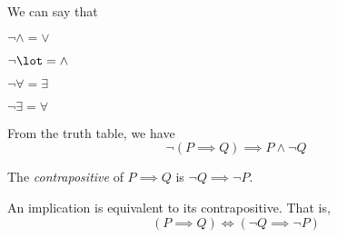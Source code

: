 \begin{named}[Note]
We can say that
\bitem
\item $\lnot \land = \lor$
\item $\lnot \lot = \land$
\item $\lnot \forall = \exists$
\item $\lnot \exists = \forall$
\eitem
\end{named}

From the truth table, we have 
$$\lnot (P \implies Q) \implies P \land \lnot Q$$

\begin{definition}
	The \emph{contrapositive} of $P \implies Q$ is $\lnot Q \implies \lnot P$.
\end{definition}

\begin{theorem}
	An implication is equivalent to its contrapositive. That is,
	$$(P \implies Q) \iff (\lnot Q \implies \lnot P)$$
\end{theorem}



